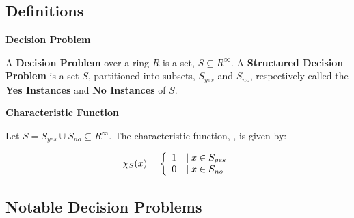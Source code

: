   \subsection{Definitions}
  
  \begin{definition}{\textbf{Decision Problem}}
      
    A \textbf{Decision Problem} over a ring $R$ is a set, $S \subseteq
    R^\infty$.  A \textbf{Structured Decision Problem} is a set $S$,
    partitioned into subsets, $S_{yes}$ and $S_{no}$, respectively
    called the \textbf{Yes Instances} and \textbf{No Instances} of 
    $S$.
 
  \end{definition}

  \begin{definition}{\textbf{Characteristic Function}}

    Let $S = S_{yes} \cup S_{no} \subseteq R^{\infty}$.  The
    characteristic function,
    , is given by:

    $$\chi_S(x) = \left\{ \begin{array}{ll} 1 & \mid x \in S_{yes} \\ 0 & \mid x \in S_{no} \end{array} \right.$$
  \end{definition}

  \subsection{Notable Decision Problems}

